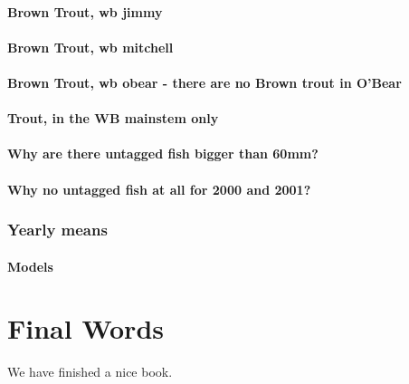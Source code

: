 \documentclass[
]{book}
\begin{document}
\hypertarget{brown-trout-wb-jimmy}{%
\subsubsection{Brown Trout, wb jimmy}\label{brown-trout-wb-jimmy}}

\hypertarget{brown-trout-wb-mitchell}{%
\subsubsection{Brown Trout, wb mitchell}\label{brown-trout-wb-mitchell}}

\hypertarget{brown-trout-wb-obear---there-are-no-brown-trout-in-obear}{%
\subsubsection{Brown Trout, wb obear - there are no Brown trout in O'Bear}\label{brown-trout-wb-obear---there-are-no-brown-trout-in-obear}}

\hypertarget{trout-in-the-wb-mainstem-only}{%
\subsubsection{Trout, in the WB mainstem only}\label{trout-in-the-wb-mainstem-only}}

\hypertarget{why-are-there-untagged-fish-bigger-than-60mm}{%
\subsubsection{Why are there untagged fish bigger than 60mm?}\label{why-are-there-untagged-fish-bigger-than-60mm}}

\hypertarget{why-no-untagged-fish-at-all-for-2000-and-2001}{%
\subsubsection{Why no untagged fish at all for 2000 and 2001?}\label{why-no-untagged-fish-at-all-for-2000-and-2001}}

\hypertarget{yearly-means}{%
\subsection{Yearly means}\label{yearly-means}}

\hypertarget{models-1}{%
\subsubsection{Models}\label{models-1}}

\hypertarget{final-words}{%
\chapter{Final Words}\label{final-words}}

We have finished a nice book.

  
\end{document}

